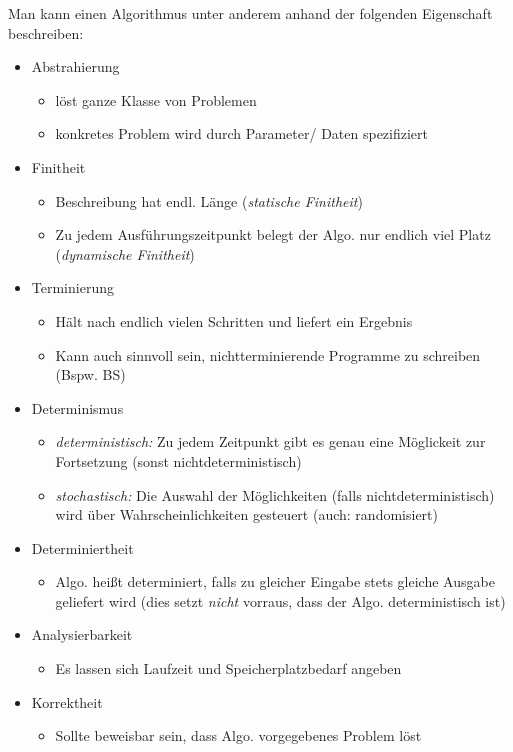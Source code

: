 \begin{defi}
  Man kann einen Algorithmus unter anderem anhand der folgenden Eigenschaft beschreiben:
	\begin{itemize}
		\item Abstrahierung
		      \begin{itemize}
			      \item löst ganze Klasse von Problemen
			      \item konkretes Problem wird durch Parameter/ Daten spezifiziert
		      \end{itemize}
		\item Finitheit
		      \begin{itemize}
			      \item Beschreibung hat endl. Länge (\emph{statische Finitheit})
			      \item Zu jedem Ausführungszeitpunkt belegt der Algo. nur endlich viel Platz (\emph{dynamische Finitheit})
		      \end{itemize}
		\item Terminierung
		      \begin{itemize}
			      \item Hält nach endlich vielen Schritten und liefert ein Ergebnis
			      \item Kann auch sinnvoll sein, nichtterminierende Programme zu schreiben (Bspw. BS)
		      \end{itemize}
		\item Determinismus
		      \begin{itemize}
			      \item \emph{deterministisch:} Zu jedem Zeitpunkt gibt es genau eine Möglickeit zur Fortsetzung (sonst nichtdeterministisch)
			      \item \emph{stochastisch:} Die Auswahl der Möglichkeiten (falls nichtdeterministisch) wird über Wahrscheinlichkeiten gesteuert (auch: randomisiert)
		      \end{itemize}
		\item Determiniertheit
		      \begin{itemize}
			      \item Algo. heißt determiniert, falls zu gleicher Eingabe stets gleiche Ausgabe geliefert wird (dies setzt \emph{nicht} vorraus, dass der Algo. deterministisch ist)
		      \end{itemize}
		\item Analysierbarkeit
		      \begin{itemize}
			      \item Es lassen sich Laufzeit und Speicherplatzbedarf angeben
		      \end{itemize}
		\item Korrektheit
		      \begin{itemize}
			      \item Sollte beweisbar sein, dass Algo. vorgegebenes Problem löst
		      \end{itemize}
	\end{itemize}
\end{defi}

